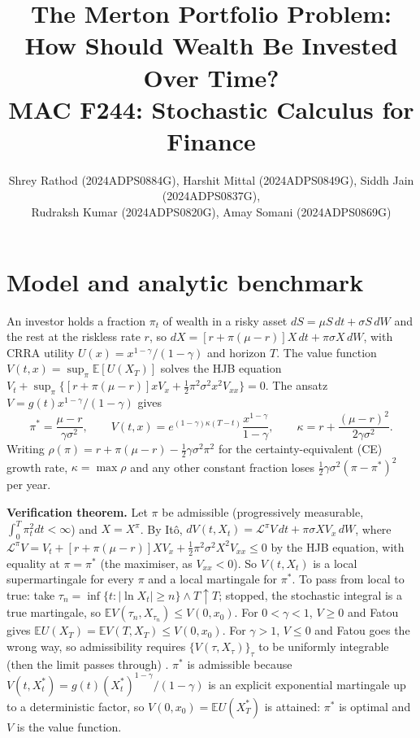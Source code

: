 \documentclass[10pt,a4paper]{article}
\title{\vspace{-8mm}\Large\textbf{The Merton Portfolio Problem: How Should Wealth Be Invested Over Time?}\\[-1mm]\large MAC F244: Stochastic Calculus for Finance\vspace{-3mm}}
\author{\normalsize Shrey Rathod (2024ADPS0884G), Harshit Mittal (2024ADPS0849G), Siddh Jain (2024ADPS0837G),\\ Rudraksh Kumar (2024ADPS0820G), Amay Somani (2024ADPS0869G)}
\date{}
\newcommand{\E}{\mathbb E}
\begin{document}
\maketitle\vspace{-6mm}
\small
\section{Model and analytic benchmark}
An investor holds a fraction $\pi_t$ of wealth in a risky asset $dS=\mu S\,dt+\sigma S\,dW$ and the rest at the riskless rate $r$, so $dX=[r+\pi(\mu-r)]X\,dt+\pi\sigma X\,dW$, with CRRA utility $U(x)=x^{1-\gamma}/(1-\gamma)$ and horizon $T$. The value function $V(t,x)=\sup_\pi\E[U(X_T)]$ solves the HJB equation \cite{merton69,merton71,oks,pham}
$V_t+\sup_\pi\{[r+\pi(\mu-r)]xV_x+\tfrac12\pi^2\sigma^2x^2V_{xx}\}=0$. The ansatz $V=g(t)x^{1-\gamma}/(1-\gamma)$ gives
\begin{equation}\pi^*=\frac{\mu-r}{\gamma\sigma^2},\qquad V(t,x)=e^{(1-\gamma)\kappa(T-t)}\frac{x^{1-\gamma}}{1-\gamma},\qquad \kappa=r+\frac{(\mu-r)^2}{2\gamma\sigma^2}.\end{equation}
Writing $\rho(\pi)=r+\pi(\mu-r)-\tfrac12\gamma\sigma^2\pi^2$ for the certainty-equivalent (CE) growth rate, $\kappa=\max\rho$ and any other constant fraction loses $\tfrac12\gamma\sigma^2(\pi-\pi^*)^2$ per year.

\textbf{Verification theorem.} Let $\pi$ be admissible (progressively measurable, $\int_0^T\pi_t^2dt<\infty$) and $X=X^\pi$. By It\^o, $dV(t,X_t)=\mathcal L^\pi V\,dt+\pi\sigma XV_x\,dW$, where $\mathcal L^\pi V=V_t+[r+\pi(\mu-r)]XV_x+\tfrac12\pi^2\sigma^2X^2V_{xx}\le0$ by the HJB equation, with equality at $\pi=\pi^*$ (the maximiser, as $V_{xx}<0$). So $V(t,X_t)$ is a local supermartingale for every $\pi$ and a local martingale for $\pi^*$. To pass from local to true: take $\tau_n=\inf\{t:|\ln X_t|\ge n\}\wedge T\uparrow T$; stopped, the stochastic integral is a true martingale, so $\E V(\tau_n,X_{\tau_n})\le V(0,x_0)$. For $0<\gamma<1$, $V\ge0$ and Fatou gives $\E U(X_T)=\E V(T,X_T)\le V(0,x_0)$. For $\gamma>1$, $V\le0$ and Fatou goes the wrong way, so admissibility requires $\{V(\tau,X_\tau)\}_\tau$ to be uniformly integrable (then the limit passes through) \cite[Ch.~3]{pham}. $\pi^*$ is admissible because $V(t,X^*_t)=g(t)(X^*_t)^{1-\gamma}/(1-\gamma)$ is an explicit exponential martingale up to a deterministic factor, so $V(0,x_0)=\E U(X^*_T)$ is attained: $\pi^*$ is optimal and $V$ is the value function.
\end{document}
